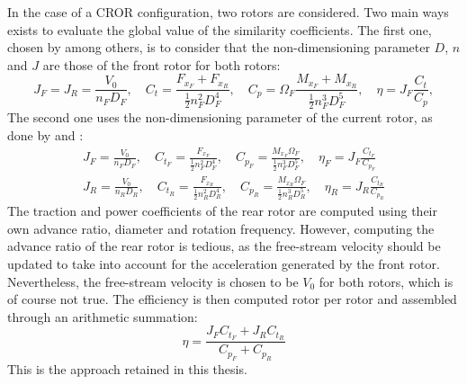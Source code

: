 In the case of a CROR configuration, two rotors are considered.
Two main ways exists to evaluate the global value of the
similarity coefficients. The first one, chosen by
\citet{Bechet2011} among others, is to consider
that the non-dimensioning parameter $D$, $n$ and $J$ are those
of the front rotor for both rotors:
\begin{equation}
    J_F = J_R = \frac{V_0}{n_F D_F}, \quad
    C_t = \frac{F_{x_F} + F_{x_R}}{\frac{1}{2} n_F ^ 2  D_F ^ 4}, \quad
    C_p = \Omega_F \frac{M_{x_F} + M_{x_R}}{\frac{1}{2} n_F ^ 3 D_F ^ 5}, \quad
    \eta = J_F \frac{C_t}{C_p},   
\end{equation} 
The second one uses the non-dimensioning parameter of the current rotor,
as done by \citet{Stuermer2008} and \citet{Zachariadis2011}:
\begin{equation}
    \begin{split}
        J_F = \frac{V_0}{n_F D_F}, \quad
        C_{t_F} = \frac{F_{x_F}}{\frac{1}{2} n_F ^ 2  D_F ^ 4}, \quad
        C_{p_F} = \frac{M_{x_F}\Omega_F}{\frac{1}{2} n_F ^ 3 D_F ^ 5}, \quad
        \eta_F = J_F \frac{C_{t_F}}{C_{p_F}} \\
        J_R = \frac{V_0}{n_R D_R}, \quad
        C_{t_R} = \frac{F_{x_R}}{\frac{1}{2} n_R ^ 2  D_R ^ 4}, \quad
        C_{p_R} = \frac{M_{x_R}\Omega_F}{\frac{1}{2} n_R ^ 3 D_R ^ 5}, \quad
        \eta_R = J_R \frac{C_{t_R}}{C_{p_R}}
    \end{split}
\end{equation} 
The traction and power coefficients of the rear rotor are
computed using their own advance ratio, diameter and rotation frequency.
However, computing the advance ratio of the rear rotor is tedious, as
the free-stream velocity should be updated to take into account
for the acceleration generated by the front rotor. Nevertheless, the free-stream
velocity is chosen to be $V_0$ for both rotors, which is of course not true.
The efficiency is then computed rotor per rotor and
assembled through an arithmetic summation:
\begin{equation}
    \eta = \frac{J_F C_{t_F} + J_R C_{t_R}}{C_{p_F} + C_{p_R}}
\end{equation}
This is the approach retained in this thesis.
